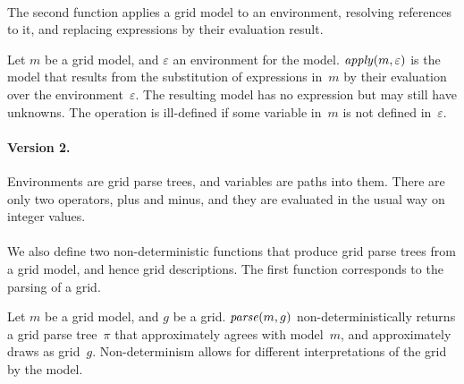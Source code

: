 \documentclass[a4paper]{llncs}
\begin{document}
\paragraph{}The second function applies a grid model to an
environment, resolving references to it, and replacing expressions by
their evaluation result.

\begin{definition}
  Let $m$ be a grid model, and $\varepsilon$ an environment for the
  model. ${\it apply}(m,\varepsilon)$ is the model that results from
  the substitution of expressions in~$m$ by their evaluation over the
  environment~$\varepsilon$. The resulting model has no expression but
  may still have unknowns.
  The operation is ill-defined if some variable in~$m$ is not defined
  in~$\varepsilon$. 
\end{definition}

\paragraph{Version 2.} Environments are grid parse trees, and
variables are paths into them. There are only two operators, plus and
minus, and they are evaluated in the usual way on integer values.

\paragraph{}
We also define two non-deterministic functions that produce grid parse
trees from a grid model, and hence grid descriptions. The first
function corresponds to the parsing of a grid.

\begin{definition}
  Let $m$ be a grid model, and $g$ be a grid. ${\it parse}(m,g)$
  non-deterministically returns a grid parse tree~$\pi$ that
  approximately agrees with model~$m$, and approximately draws as
  grid~$g$. Non-determinism allows for different interpretations of
  the grid by the model.
\end{definition}
\end{document}
